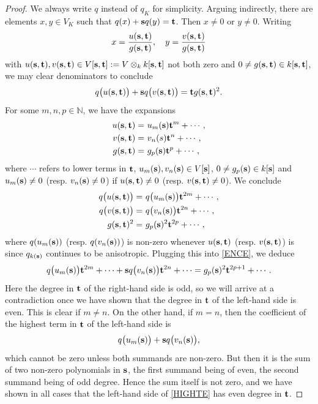 \documentclass{amsart}
\theoremstyle{definition} %
\theoremstyle{remark} %
\renewcommand{\:}{\colon\,}
\numberwithin{equation}{section}
\begin{document}
\begin{proof} We always write $q$ instead of $q_K$ for simplicity. Arguing indirectly, there are elements  $x,y \in V_K$ such that $q(x) + {\bf s} q(y) = {\bf t}$. Then $x \ne 0$ or $y \ne 0$.	Writing
	\begin{align*}
		x = \frac{u({\bf s},{\bf t})}{g({\bf s},{\bf t})}, \quad y = \frac{v({\bf s},{\bf t})}{g({\bf s},{\bf t})}
	\end{align*}
	with $u({\bf s},{\bf t}),v({\bf s},{\bf t}) \in V[{\bf s},{\bf t}] := V \otimes_k k[{\bf s},{\bf t}]$ not both zero and $0 \ne g({\bf s},{\bf t}) \in k[{\bf s},{\bf t}]$, we may clear denominators to conclude
	\begin{align}
		\label{ENCE} q\big(u({\bf s},{\bf t})\big) + {\bf s} q\big(v({\bf s},{\bf t})\big) = {\bf t} g({\bf s},{\bf t})^2.
	\end{align}
	For some $m,n,p \in \mathbb{N}$, we have the expansions
	\begin{align*}
		u({\bf s},{\bf t}) =\,\,&u_m({\bf s}){\bf t}^m + \cdots, \\
		v({\bf s},{\bf t}) =\,\,&v_n(s){\bf t}^n + \cdots, \\
		g({\bf s},{\bf t}) =\,\,&g_p({\bf s}){\bf t}^p + \cdots,  
	\end{align*}
	where $\cdots$ refers to lower terms in ${\bf t}$, $u_m({\bf s}), v_n({\bf s}) \in V[{\bf s}]$, $0 \ne g_p({\bf s}) \in k[{\bf s}]$ and $u_m({\bf s}) \ne 0$ (resp. $v_n({\bf s}) \ne 0$) if $u({\bf s},{\bf t}) \ne 0$ (resp. $v({\bf s},{\bf t}) \ne0$). We conclude
	\begin{align*}
		q\big(u({\bf s},{\bf t})\big) =\,\,&q\big(u_m({\bf s})\big){\bf t}^{2m} + \cdots, \\
		q\big(v({\bf s},{\bf t})\big) =\,\,& q\big(v_n({\bf s})\big){\bf t}^{2n} + \cdots, \\
		g({\bf s},{\bf t})^2 =\,\,&g_p({\bf s})^2{\bf t}^{2p} + \cdots,
	\end{align*}
	where $q(u_m({\bf s}))$ (resp. $q(v_n({\bf s}))$) is non-zero whenever $u({\bf s},{\bf t})$ (resp. $v({\bf s},{\bf t})$) is since $q_{k({\bf s})}$ continues to be anisotropic. Plugging this into \eqref{ENCE}, we deduce
	\begin{align}
		\label{HIGHTE} q\big(u_m({\bf s})\big){\bf t}^{2m} + \cdots + {\bf s} q\big(v_n({\bf s})\big){\bf t}^{2n} + \cdots = g_p({\bf s})^2{\bf t}^{2p+1} + \cdots.
	\end{align}
	Here the degree in ${\bf t}$ of the right-hand side is odd, so we will arrive at a contradiction once we have shown that the degree in ${\bf t}$ of the left-hand side is even. This is clear if $m \ne n$. On the other hand, if $m = n$, then the coefficient of the highest term in ${\bf t}$ of the left-hand side is 
	\[
	q\big(u_m({\bf s})\big) + {\bf s} q\big(v_n({\bf s})\big),
	\]
	which cannot be zero unless both summands are non-zero. But then it is the sum of two non-zero polynomials in ${\bf s}$, the first summand being of even, the second summand being of odd degree. Hence the sum itself is not zero, and we have shown in all cases that the left-hand side of \eqref{HIGHTE} has even degree in ${\bf t}$. 
\end{proof}
\end{document}
